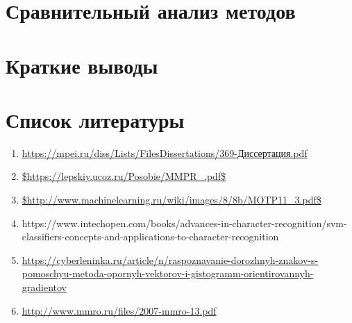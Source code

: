 \documentclass[12pt,a4paper]{article}
\begin{document}
\section{Сравнительный анализ методов}
\section{Краткие выводы}
\section{Список литературы}
\begin{enumerate}
    \item \url{https://mpei.ru/diss/Lists/FilesDissertations/369-Диссертация.pdf}
    \item \url{$https://lepskiy.ucoz.ru/Posobie/MMPR_.pdf$}
    \item \url{$http://www.machinelearning.ru/wiki/images/8/8b/MOTP11_3.pdf$}
    \item https://www.intechopen.com/books/advances-in-character-recognition/svm-classifiers-concepts-and-applications-to-character-recognition
    \item \url{https://cyberleninka.ru/article/n/raspoznavanie-dorozhnyh-znakov-s-pomoschyu-metoda-opornyh-vektorov-i-gistogramm-orientirovannyh-gradientov}
    \item \url{http://www.mmro.ru/files/2007-mmro-13.pdf}
\end{enumerate}
\end{document}
